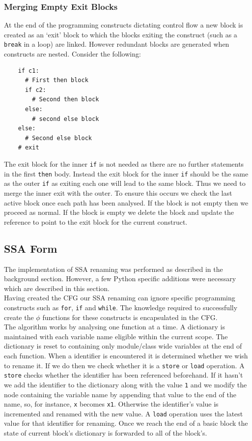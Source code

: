 \documentclass[12pt, titlepage]{article}
\begin{document}
\subsubsection{Merging Empty Exit Blocks}
At the end of the programming constructs dictating control flow a new block is created as an `exit' block to which the blocks exiting the construct (such as a \texttt{break} in a loop) are linked. However redundant blocks are generated when constructs are nested. Consider the following:
\begin{lstlisting}
    if c1:
      # First then block
      if c2:
        # Second then block
      else:
        # second else block
    else:
      # Second else block
    # exit
\end{lstlisting}
The exit block for the inner \texttt{if} is not needed as there are no further statements in the first \texttt{then} body. Instead the exit block for the inner \texttt{if} should be the same as the outer \texttt{if} as exiting each one will lead to the same block. Thus we need to merge the inner exit with the outer. To ensure this occurs we check the last active block once each path has been analysed. If the block is not empty then we proceed as normal. If the block is empty we delete the block and update the reference to point to the exit block for the current construct.

\subsection{SSA Form}
The implementation of SSA renaming was performed as described in the background section. However, a few Python specific additions were necessary which are described in this section. \\
\indent Having created the CFG our SSA renaming can ignore specific programming constructs such as \texttt{for}, \texttt{if} and \texttt{while}. The knowledge required to successfully create the $\phi$ functions for these constructs is encapsulated in the CFG. \\
\indent The algorithm works by analysing one function at a time. A dictionary is maintained with each variable name eligible within the current scope. The dictionary is reset to containing only module/class wide variables at the end of each function. When a identifier is encountered it is determined whether we wish to rename it. If we do then we check whether it is a \texttt{store} or \texttt{load} operation. A \texttt{store} checks whether the identifier has been referenced beforehand. If it hasn't we add the identifier to the dictionary along with the value \texttt{1} and we modify the node containing the variable name by appending that value to the end of the name, so, for instance, \texttt{x} becomes \texttt{x1}. Otherwise the identifier's value is incremented and renamed with the new value. A \texttt{load} operation uses the latest value for that identifier for renaming. Once we reach the end of a basic block the state of current block's dictionary is forwarded to all of the block's.
\end{document}
